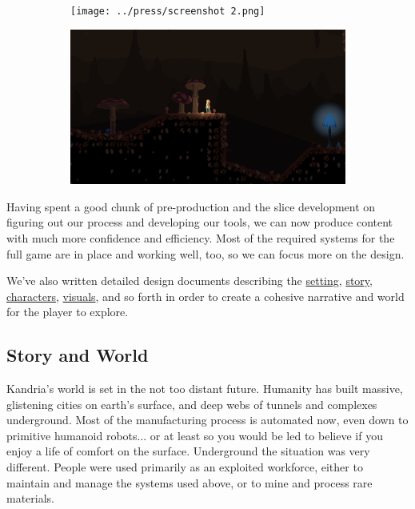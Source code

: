 \begin{figure}[h]
\begin{subfigure}[t]{0.35\textwidth}
    \centering
    \texttt{[image: ../press/screenshot 2.png]}
  \end{subfigure}
  \begin{subfigure}[t]{0.55\textwidth}\vskip 0pt
    \centering
    \includegraphics[width=\textwidth]{../press/screenshot 3.png}
  \end{subfigure}
\end{figure}

Having spent a good chunk of pre-production and the slice development on figuring out our process and developing our tools, we can now produce content with much more confidence and efficiency. Most of the required systems for the full game are in place and working well, too, so we can focus more on the design.

We've also written detailed design documents describing the \href{https://kandria.com/lore}{setting}, \href{https://kandria.com/plot outline}{story}, \href{https://kandria.com/characters}{characters}, \href{https://kandria.com/art}{visuals}, and so forth in order to create a cohesive narrative and world for the player to explore.

\clearpage
\subsection{Story and World}
Kandria's world is set in the not too distant future. Humanity has built massive, glistening cities on earth's surface, and deep webs of tunnels and complexes underground. Most of the manufacturing process is automated now, even down to primitive humanoid robots... or at least so you would be led to believe if you enjoy a life of comfort on the surface. Underground the situation was very different. People were used primarily as an exploited workforce, either to maintain and manage the systems used above, or to mine and process rare materials.

